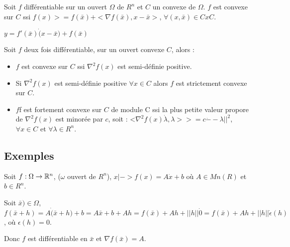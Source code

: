 		\begin{theoreme}
		Soit $f$ différentiable sur un ouvert $\Omega$ de $R^n$ et $C$ un convexe de $\Omega$.
		$f$ est convexe sur $C$ ssi $f(x) >= f(\bar{x}) + <\nabla f(\bar{x}), x-\bar{x}>$, $\forall (x, \bar{x}) \in C x C$.
		\end{theoreme}
		
		$y=f'(\bar{x}) \dot (x-\bar{x}) +f(\bar{x})$
		
		\begin{theoreme}
		Soit $f$ deux fois différentiable, sur un ouvert convexe $C$, alors :
		\begin{itemize}
			\item $f$ est convexe sur $C$ ssi $\nabla^2 f(x)$ est semi-définie positive.
			\item Si $\nabla^2 f(x)$ est semi-définie positive $\forall x \in C$ alors $f$ est strictement convexe sur $C$.
			\item $f$f est fortement convexe sur $C$ de module C ssi la plus petite valeur propore de $\nabla^2 f(x)$ est minorée par $c$, soit : <$\nabla^2 f(x) \dot \lambda, \lambda> >= c \dot --\lambda ||^2$, $\forall x \in C$ et $\forall \lambda \in R^n$.
		\end{itemize}
		\end{theoreme}
		
		
	\subsection{Exemples}
	
		\begin{exemple}
		
		Soit $f:\Omega \rightarrow \mathbb{R}^n$, ($\omega$ ouvert de $R^n$), $x|-> f(x) = A \dot x +b$ où $A \in Mn(R)$ et $b \in R^n$.
		
		Soit $\bar{x}) \in \Omega$, $f(\bar{x} +h) = A \dot (\bar{x}+h) + b = A \bar{x} + b + Ah = f(\bar{x}) + Ah + ||h|| \dot 0 = f(\bar{x}) + Ah + ||h|| \dot \epsilon (h)$, où $\epsilon (h) = 0$.
		
		Donc $f$ est différentiable en $\bar{x}$ et $\nabla f(\bar{x}) = A$.
		\end{exemple}
		
